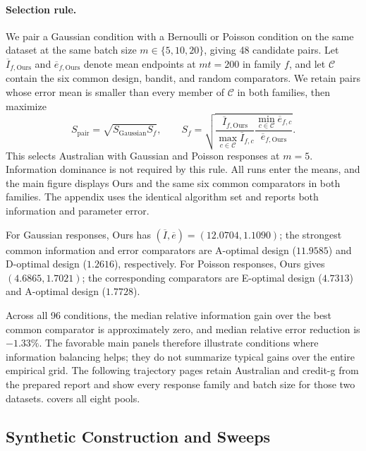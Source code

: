 \documentclass[10pt,twoside,letterpaper]{article}
\begin{document}
\paragraph{Selection rule.}
We pair a Gaussian condition with a Bernoulli or Poisson condition on
the same dataset at the same batch size $m\in\{5,10,20\}$, giving 48
candidate pairs. Let $\overline I_{f,\mathrm{Ours}}$ and
$\overline e_{f,\mathrm{Ours}}$ denote mean endpoints at $mt=200$ in
family $f$, and let $\mathcal C$ contain the six common design,
bandit, and random comparators. We retain pairs whose error mean is
smaller than every member of $\mathcal C$ in both families, then maximize
\begin{equation}
  S_{\mathrm{pair}}=\sqrt{S_{\mathrm{Gaussian}}S_f},\qquad
  S_f=\sqrt{
    \frac{\overline I_{f,\mathrm{Ours}}}
         {\max_{c\in\mathcal C}\overline I_{f,c}}
    \frac{\min_{c\in\mathcal C}\overline e_{f,c}}
         {\overline e_{f,\mathrm{Ours}}}}.
  \label{eq:empirical-selection}
\end{equation}
This selects Australian with Gaussian and Poisson responses at $m=5$.
Information dominance is not required by this rule. All runs enter
the means, and the main figure displays Ours and the same six common
comparators in both families. The appendix uses the identical algorithm
set and reports both information and parameter error.

For Gaussian responses, Ours has
$(\overline I,\overline e)=(12.0704,1.1090)$; the strongest common
information and error comparators are A-optimal design ($11.9585$)
and D-optimal design ($1.2616$), respectively. For Poisson responses,
Ours gives $(4.6865,1.7021)$; the corresponding comparators are
E-optimal design ($4.7313$) and A-optimal design ($1.7728$).

Across all 96 conditions, the median relative information gain over the
best common comparator is approximately zero, and median relative
error reduction is $-1.33\%$. The favorable main panels therefore
illustrate conditions where information balancing helps; they do not
summarize typical gains over the entire empirical grid.
The following trajectory pages retain Australian and credit-g from
the prepared report and show every response family and batch size for
those two datasets.  covers all eight pools.

\subsection{Synthetic Construction and Sweeps}
\label{app:synthetic-details}
\end{document}
